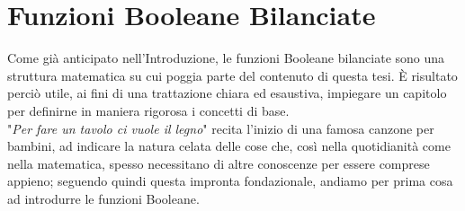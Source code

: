 \documentclass[12pt,a4paper,openright]{report}
\begin{document}
\chapter{Funzioni Booleane Bilanciate}
Come già anticipato nell'Introduzione, le funzioni Booleane bilanciate sono una struttura matematica su cui poggia parte del contenuto di questa tesi.
È risultato perciò utile, ai fini di una trattazione chiara ed esaustiva, impiegare un capitolo per definirne in maniera rigorosa i concetti di base.\\
"\textit{Per fare un tavolo ci vuole il legno}" recita l'inizio di una famosa canzone per bambini, ad indicare la natura celata delle cose che, così nella quotidianità
come nella matematica, spesso necessitano di altre conoscenze per essere comprese appieno; seguendo quindi questa impronta fondazionale, andiamo per prima cosa ad introdurre le funzioni Booleane.
\end{document}
